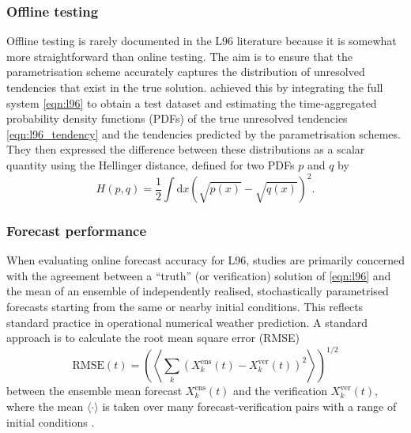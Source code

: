 \documentclass[titlepage,twoside]{article}
\numberwithin{equation}{section}
\begin{document}
\subsubsection{Offline testing}
Offline testing is rarely documented in the L96 literature because it is
somewhat more straightforward than online testing. The aim is to ensure that
the parametrisation scheme accurately captures the distribution of unresolved
tendencies that exist in the true solution. \textcite{gagne2020} achieved this
by integrating the full system \cref{eqn:l96} to obtain a test dataset and
estimating the time-aggregated probability density functions (PDFs) of the true
unresolved tendencies \cref{eqn:l96_tendency} and the tendencies predicted by
the parametrisation schemes. They then expressed the difference between these
distributions as a scalar quantity using the Hellinger distance, defined for
two PDFs $p$ and $q$ by
\begin{equation} \label{eqn:hellinger}
    H(p,q) = \frac{1}{2} \int \mathrm{d}x
        \left( \sqrt{p(x)} - \sqrt{q(x)} \right)^2.
\end{equation}

\subsubsection{Forecast performance}
When evaluating online forecast accuracy for L96, studies are primarily
concerned with the agreement between a ``truth'' (or verification) solution of
\cref{eqn:l96} and the mean of an ensemble of independently realised,
stochastically parametrised forecasts starting from the same or nearby initial
conditions. This reflects standard practice in operational numerical weather
prediction. A standard approach is to calculate the root mean square error
(RMSE)
\begin{equation*}
    \mathrm{RMSE}(t) = \left( \left\langle
        \sum_k (X_k^\text{ens}(t) - X_k^\text{ver}(t))^2
    \right\rangle \right)^{1/2}
\end{equation*}
between the ensemble mean forecast $X_k^\text{ens}(t)$ and the verification
$X_k^\text{ver}(t)$, where the mean $\langle \cdot \rangle$ is taken over many
forecast-verification pairs with a range of initial conditions
\parencite{crommelin2008,gagne2020}.
\end{document}
